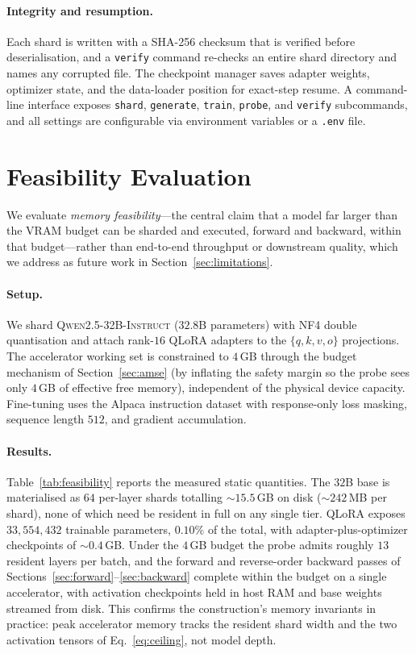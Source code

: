 \documentclass{article}
\begin{document}
\paragraph{Integrity and resumption.} Each shard is written with a SHA-256
checksum that is verified before deserialisation, and a \texttt{verify} command
re-checks an entire shard directory and names any corrupted file. The checkpoint
manager saves adapter weights, optimizer state, and the data-loader position for
exact-step resume. A command-line interface exposes \texttt{shard},
\texttt{generate}, \texttt{train}, \texttt{probe}, and \texttt{verify}
subcommands, and all settings are configurable via environment variables or a
\texttt{.env} file.

\section{Feasibility Evaluation}
\label{sec:eval}

We evaluate \emph{memory feasibility}---the central claim that a model far larger
than the VRAM budget can be sharded and executed, forward and backward, within
that budget---rather than end-to-end throughput or downstream quality, which we
address as future work in Section~\ref{sec:limitations}.

\paragraph{Setup.} We shard \textsc{Qwen2.5-32B-Instruct} ($32.8$B parameters)
with NF4 double quantisation and attach rank-$16$ QLoRA adapters to the
$\{q,k,v,o\}$ projections. The accelerator working set is constrained to $4$\,GB
through the budget mechanism of Section~\ref{sec:amse} (by inflating the safety
margin so the probe sees only $4$\,GB of effective free memory), independent of
the physical device capacity. Fine-tuning uses the Alpaca instruction dataset
with response-only loss masking, sequence length $512$, and gradient
accumulation.

\paragraph{Results.} Table~\ref{tab:feasibility} reports the measured static
quantities. The $32$B base is materialised as $64$ per-layer shards totalling
$\sim$$15.5$\,GB on disk ($\sim$$242$\,MB per shard), none of which need be
resident in full on any single tier. QLoRA exposes $33{,}554{,}432$ trainable
parameters, $0.10\%$ of the total, with adapter-plus-optimizer checkpoints of
$\sim$$0.4$\,GB. Under the $4$\,GB budget the probe admits roughly $13$ resident
layers per batch, and the forward and reverse-order backward passes of
Sections~\ref{sec:forward}--\ref{sec:backward} complete within the budget on a
single accelerator, with activation checkpoints held in host RAM and base weights
streamed from disk. This confirms the construction's memory invariants in
practice: peak accelerator memory tracks the resident shard width and the two
activation tensors of Eq.~\eqref{eq:ceiling}, not model depth.
\end{document}
